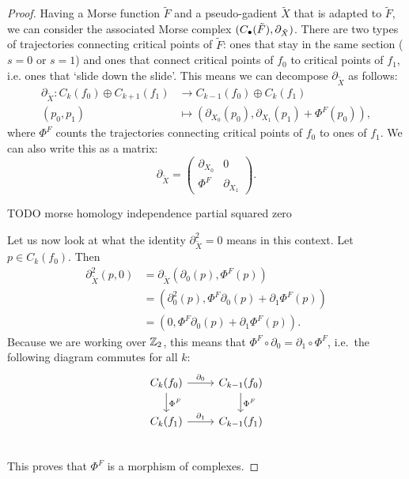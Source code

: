 \begin{proof}
Having a Morse function $\tilde{F}$ and a pseudo-gadient $\tilde{X}$ that is adapted to $\tilde{F}$, we can consider the associated Morse complex $(C_\bullet(\tilde{F}), \partial_{\tilde{X}})$.
There are two types of trajectories connecting critical points of $\tilde{F}$: ones that stay in the same section ($s = 0$ or $s = 1$)  and ones that connect critical points of $f_0$ to critical points of $f_1$, i.e. ones that `slide down the slide'.
This means we can decompose $\partial_{\tilde{X}}$ as follows:
\begin{align*}
    \partial_{\tilde{X}}: C_k(f_0) \oplus C_{k+1}(f_1) &\longrightarrow C_{k-1}(f_0) \oplus C_k(f_1) \\
    (p_0, p_1) &\longmapsto (\partial_{X_0}(p_0), \partial_{X_1}(p_1)+ \Phi^{F}(p_0))
,\end{align*}
where $\Phi^{F}$ counts the trajectories connecting critical points of $f_0$ to ones of $f_1$. We can also write this as a matrix:
\[
\partial_{\tilde{X}} = \begin{pmatrix}
    \partial_{X_0} & 0 \\
     \Phi^{F}& \partial_{X_1}
\end{pmatrix}
.\] 

\begin{marginfigure}
    \centering
    \caption{TODO morse homology independence partial squared zero}
    \label{fig:morse-homology-independence-partial-squared-zero}
\end{marginfigure}

Let us now look at what the identity $\partial_{\tilde{X}}^2 = 0$ means in this context. Let $p \in C_k(f_0)$.
Then
\begin{align*}
    \partial_{\tilde{X}}^2 (p, 0) &= \partial_{\tilde{X}}(\partial_{0}(p),  \Phi^{F}(p))\\
                                                      &= (\partial_0^2(p), \Phi^{F}\partial_0(p)+ \partial_1 \Phi^{F}(p))\\
                                                    &= (0, \Phi^{F}\partial_0(p)+ \partial_1 \Phi^{F}(p))
.\end{align*} 
Because we are working over $\mathbb{Z}_2$, this means that $\Phi^{F}  \circ  \partial_0 = \partial_1  \circ  \Phi^{F}$, i.e.\ the following diagram commutes for all $k$:
\[
    \begin{tikzcd}
        C_k(f_0) \arrow[d, "\Phi^{F}"]\arrow[r, "\partial_0"] &C_{k-1}(f_0) \arrow[d, "\Phi^{F}"]\\
        C_k(f_1) \arrow[r, "\partial_1"] &C_{k-1}(f_1)\\
    \end{tikzcd}
\]
This proves that $\Phi^{F}$ is a morphism of complexes.


\end{proof}
